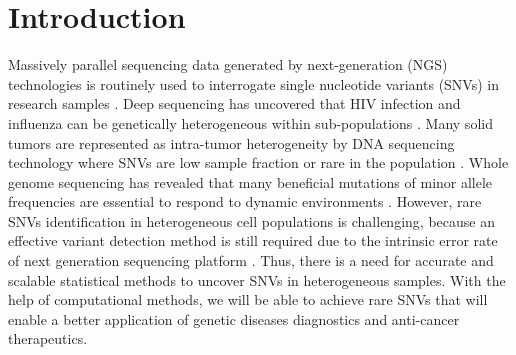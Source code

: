 \documentclass[11pt,reqno]{amsart}
\begin{document}
\section{Introduction}
Massively parallel sequencing data generated by next-generation (NGS) technologies is routinely used to interrogate single nucleotide variants (SNVs) in research samples \citep{koboldt2013next}.
Deep sequencing has uncovered that HIV infection and influenza can be genetically heterogeneous within sub-populations \citep{flaherty2011ultrasensitive}.
Many solid tumors are represented as intra-tumor heterogeneity by DNA sequencing technology where SNVs are low sample fraction or rare in the population \citep{navin2010inferring}.
Whole genome sequencing has revealed that many beneficial mutations of minor allele frequencies are essential to respond to dynamic environments \citep{kvitek2013whole}.
However, rare SNVs identification in heterogeneous cell populations is challenging, because an effective variant detection method is still required due to the intrinsic error rate of next generation sequencing platform \citep{shendure2008next}.
Thus, there is a need for accurate and scalable statistical methods to uncover SNVs in heterogeneous samples.
With the help of computational methods, we will be able to achieve rare SNVs that will enable a better application of genetic diseases diagnostics and anti-cancer therapeutics.
\end{document}
